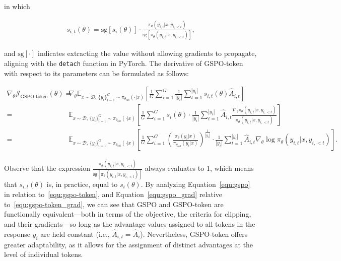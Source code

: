 in which

\begin{align}
s_{i,t}(\theta) 
= \mathrm{sg} \left[ s_{i}(\theta) \right]  \cdot \frac{ \pi_{\theta} (y_{i,t} | x, y_{i,<t}) }{ \mathrm{sg} \left[ \pi_{\theta} (y_{i,t} | x, y_{i,<t}) \right] },
\end{align}

and $\mathrm{sg}[\cdot]$ indicates extracting the value without allowing gradients to propagate, aligning with the \texttt{detach} function in PyTorch. The derivative of GSPO-token with respect to its parameters can be formulated as follows:

\begin{align}
\nabla_{\theta} \mathcal{J}_\text{GSPO-token}(\theta)
=&\ 
\nabla_{\theta} \mathbb{E}_{ x \sim \mathcal{D},\, \{y_i\}_{i=1}^G \sim \pi_{\theta_\text{old}}( \cdot | x) }
\left[ 
\frac{1}{G} \sum_{i=1}^{G}
\frac{1}{|y_i|} \sum_{t=1}^{|y_i|} 
s_{i,t}(\theta) \widehat{A}_{i,t}
\right] \\
=&\ 
\mathbb{E}_{ x \sim \mathcal{D},\, \{y_i\}_{i=1}^G \sim \pi_{\theta_\text{old}}( \cdot | x) }
\left[ 
\frac{1}{G} \sum_{i=1}^{G} s_i (\theta) \cdot \frac{1}{|y_i|} \sum_{t=1}^{|y_i|} 
\widehat{A}_{i,t} \frac{ \nabla_{\theta} \pi_{\theta} (y_{i,t} | x, y_{i,<t}) }{ \pi_{\theta} (y_{i,t} | x, y_{i,<t}) }
\right] \\
=&\ 
\mathbb{E}_{ x \sim \mathcal{D},\, \{y_i\}_{i=1}^G \sim \pi_{\theta_\text{old}}( \cdot | x) }
\left[ 
\frac{1}{G} \sum_{i=1}^{G}  \left( \frac{ \pi_{\theta} (y_i | x) }{ \pi_{\theta_\text{old}} (y_i | x)} \right)^{\frac{1}{|y_i|}}
\cdot \frac{1}{|y_i|} \sum_{t=1}^{|y_i|}
\widehat{A}_{i,t} \nabla_{\theta} \log \pi_{\theta} (y_{i,t} | x, y_{i,<t})  
\right].
\label{equ:gspo-token_grad}
\end{align}

Observe that the expression $\frac{ \pi_{\theta} (y_{i,t} | x, y_{i,<t}) }{ \mathrm{sg} \left[ \pi_{\theta} (y_{i,t} | x, y_{i,<t}) \right] }$ always evaluates to 1, which means that $s_{i,t}(\theta)$ is, in practice, equal to $s_{i}(\theta)$. By analyzing Equation~\eqref{equ:gspo} in relation to~\eqref{equ:gspo-token}, and Equation~\eqref{equ:gspo_grad} relative to~\eqref{equ:gspo-token_grad}, we can see that GSPO and GSPO-token are functionally equivalent—both in terms of the objective, the criteria for clipping, and their gradients—so long as the advantage values assigned to all tokens in the response $y_i$ are held constant (i.e., $\widehat{A}_{i,t} = \widehat{A}_{i}$). Nevertheless, GSPO-token offers greater adaptability, as it allows for the assignment of distinct advantages at the level of individual tokens.

